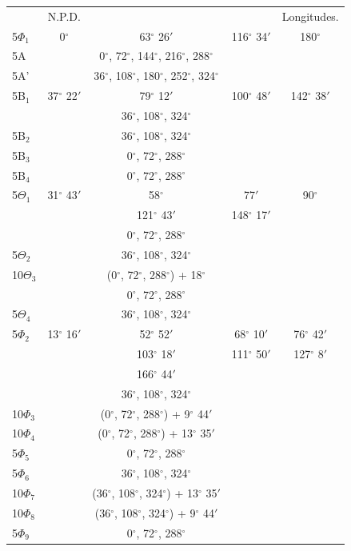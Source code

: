 \documentclass[12pt,a4paper]{article}
\theoremstyle{cayley}
\theoremstyle{definition}
\numberwithin{equation}{section}
\begin{document}
\begin{center}
\begin{tabular}{lcccc}
 & N.P.D. & & & Longitudes. \\
5$\Phi_1$ & 0$^\circ$ & 63$^\circ$ 26$'$ & 116$^\circ$ 34$'$ & 180$^\circ$ \\
5A & & 0$^\circ$, 72$^\circ$, 144$^\circ$, 216$^\circ$, 288$^\circ$ & & \\
5A' & & 36$^\circ$, 108$^\circ$, 180$^\circ$, 252$^\circ$, 324$^\circ$ & & \\
5B$_1$ & 37$^\circ$ 22$'$ & 79$^\circ$ 12$'$ & 100$^\circ$ 48$'$ & 142$^\circ$ 38$'$ \\
 & & 36$^\circ$, 108$^\circ$, 324$^\circ$ & & \\
5B$_2$ & & 36$^\circ$, 108$^\circ$, 324$^\circ$ & & \\
5B$_3$ & & 0$^\circ$, 72$^\circ$, 288$^\circ$ & & \\
5B$_4$ & & 0$^\circ$, 72$^\circ$, 288$^\circ$ & & \\
5$\Theta_1$ & 31$^\circ$ 43$'$ & 58$^\circ$ & 77$'$ & 90$^\circ$ \\
 & & 121$^\circ$ 43$'$ & 148$^\circ$ 17$'$ & \\
 & & 0$^\circ$, 72$^\circ$, 288$^\circ$ & & \\
5$\Theta_2$ & & 36$^\circ$, 108$^\circ$, 324$^\circ$ & & \\
10$\Theta_3$ & & (0$^\circ$, 72$^\circ$, 288$^\circ$) + 18$^\circ$ & & \\
 & & 0$^\circ$, 72$^\circ$, 288$^\circ$ & & \\
5$\Theta_4$ & & 36$^\circ$, 108$^\circ$, 324$^\circ$ & & \\
5$\Phi_2$ & 13$^\circ$ 16$'$ & 52$^\circ$ 52$'$ & 68$^\circ$ 10$'$ & 76$^\circ$ 42$'$ \\
 & & 103$^\circ$ 18$'$ & 111$^\circ$ 50$'$ & 127$^\circ$ 8$'$ \\
 & & 166$^\circ$ 44$'$ & & \\
 & & 36$^\circ$, 108$^\circ$, 324$^\circ$ & & \\
10$\Phi_3$ & & (0$^\circ$, 72$^\circ$, 288$^\circ$) + 9$^\circ$ 44$'$ & & \\
10$\Phi_4$ & & (0$^\circ$, 72$^\circ$, 288$^\circ$) + 13$^\circ$ 35$'$ & & \\
5$\Phi_5$ & & 0$^\circ$, 72$^\circ$, 288$^\circ$ & & \\
5$\Phi_6$ & & 36$^\circ$, 108$^\circ$, 324$^\circ$ & & \\
10$\Phi_7$ & & (36$^\circ$, 108$^\circ$, 324$^\circ$) + 13$^\circ$ 35$'$ & & \\
10$\Phi_8$ & & (36$^\circ$, 108$^\circ$, 324$^\circ$) + 9$^\circ$ 44$'$ & & \\
5$\Phi_9$ & & 0$^\circ$, 72$^\circ$, 288$^\circ$ & & \\
\end{tabular}
\end{center}
\end{document}
